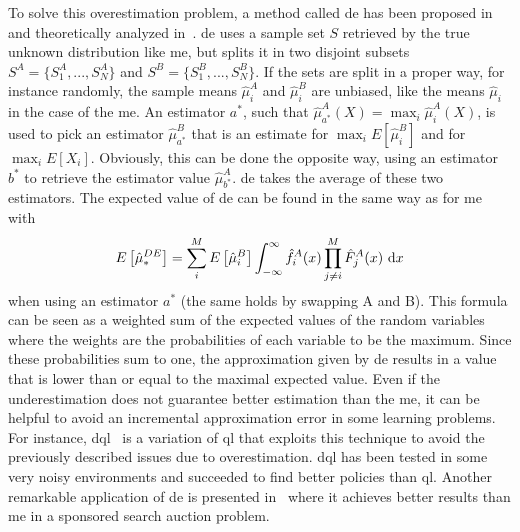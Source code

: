 To solve this overestimation problem, a method called \gls{de} has been proposed in~\cite{van2010double} and theoretically analyzed in~\cite{van2013estimating}. \gls{de} uses a sample set $S$ retrieved by the true unknown distribution like \gls{me}, but splits it in two disjoint subsets $S^A = \lbrace S^A_{1}, ..., S^A_{N} \rbrace$ and $S^B = \lbrace S^B_{1}, ..., S^B_{N} \rbrace$. If the sets are split in a proper way, for instance randomly, the sample means $\hat{\mu}^A_{i}$ and $\hat{\mu}^B_{i}$ are unbiased, like the means $\hat{\mu}_{i}$ in the case of the \gls{me}. An estimator $a^*$, such that $\hat\mu^A_{a^*}(X) = \max_{i}\hat\mu^A_{i}(X)$, is used to pick an estimator $\hat\mu^B_{a^*}$ that is an estimate for $\max_{i}E [ \hat\mu^B_{i} ]$ and for $\max_{i}E [ X_{i} ]$. Obviously, this can be done the opposite way, using an estimator $b^*$ to retrieve the estimator value $\hat{\mu}^A_{b^*}$. 
\gls{de} takes the average of these two estimators.
The expected value of \gls{de} can be found in the same way as for \gls{me} with
\begin{equation}\label{E:biasCV}
E\left[\hat\mu_*^{DE}\right]=\sum^M_i E \left[ \hat\mu^B_i \right] \int^{\infty}_{-\infty} \hat f^A_i(x) \prod^M_{j \neq i} \hat F^A_j(x)~\mathrm{d}x
\end{equation}
when using an estimator $a^*$ (the same holds by swapping A and B).
This formula can be seen as a weighted sum of the expected values of the random variables where the weights are the probabilities of each variable to be the maximum. Since these probabilities sum to one, the approximation given by \gls{de} results in a value that is lower than or equal to the maximal expected value. Even if the underestimation does not guarantee better estimation than the \gls{me}, it can be helpful to avoid an incremental approximation error in some learning problems. For instance, \gls{dql}~\cite{van2010double} is a variation of \gls{ql} that exploits this technique to avoid the previously described issues due to overestimation. \gls{dql} has been tested in some very noisy environments and succeeded to find better policies than \gls{ql}. Another remarkable application of \gls{de} is presented in~\cite{xu2013mab} where it achieves better results than \gls{me} in a sponsored search auction problem.

